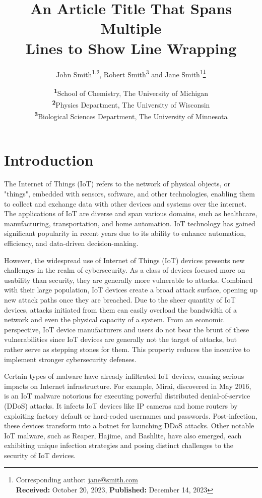 \documentclass[
	a4paper, %
	10pt, %
	unnumberedsections, %
	twoside, %
]{LTJournalArticle}
\title{An Article Title That Spans Multiple\\ Lines to Show Line Wrapping} %
\author{%
	John Smith\textsuperscript{1,2}, Robert Smith\textsuperscript{3} and Jane Smith\textsuperscript{1}\thanks{Corresponding author: \href{mailto:jane@smith.com}{jane@smith.com}\\ \textbf{Received:} October 20, 2023, \textbf{Published:} December 14, 2023}
}
\date{\footnotesize\textsuperscript{\textbf{1}}School of Chemistry, The University of Michigan\\ \textsuperscript{\textbf{2}}Physics Department, The University of Wisconsin\\ \textsuperscript{\textbf{3}}Biological Sciences Department, The University of Minnesota}
\begin{document}
\maketitle %


\section{Introduction}

The Internet of Things (IoT) refers to the network of physical objects, or "things", embedded with sensors, software, and other technologies, enabling them to collect and exchange data with other devices and systems over the internet. The applications of IoT are diverse and span various domains, such as healthcare, manufacturing, transportation, and home automation. IoT technology has gained significant popularity in recent years due to its ability to enhance automation, efficiency, and data-driven decision-making. 

However, the widespread use of Internet of Things (IoT) devices presents new challenges in the realm of cybersecurity. As a class of devices focused more on usability than security, they are generally more vulnerable to attacks. Combined with their large population, IoT devices create a broad attack surface, opening up new attack paths once they are breached. Due to the sheer quantity of IoT devices, attacks initiated from them can easily overload the bandwidth of a network and even the physical capacity of a system.\autocite{10.1007/978-3-319-68711-7_18} From an economic perspective, IoT device manufacturers and users do not bear the brunt of these vulnerabilities since IoT devices are generally not the target of attacks, but rather serve as stepping stones for them. This property reduces the incentive to implement stronger cybersecurity defenses.

Certain types of malware have already infiltrated IoT devices, causing serious impacts on Internet infrastructure. For example, Mirai, discovered in May 2016, is an IoT malware notorious for executing powerful distributed denial-of-service (DDoS) attacks. It infects IoT devices like IP cameras and home routers by exploiting factory default or hard-coded usernames and passwords. Post-infection, these devices transform into a botnet for launching DDoS attacks.\autocite{203628} Other notable IoT malware, such as Reaper, Hajime, and Bashlite, have also emerged, each exhibiting unique infection strategies and posing distinct challenges to the security of IoT devices.\autocite{7971869}
\end{document}

